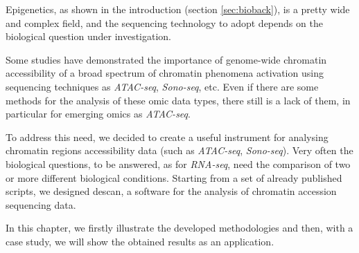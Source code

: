 
Epigenetics, as shown in the introduction (section \ref{sec:bioback}), is a pretty wide and complex field, and the sequencing technology to adopt depends on the biological question under investigation.

Some studies \cite{Koberstein2018, Auerbach2009} have demonstrated the importance of genome-wide chromatin accessibility of a broad spectrum of chromatin phenomena activation using sequencing techniques as \textit{ATAC-seq}, \textit{Sono-seq}, etc.
Even if there are some methods for the analysis of these omic data types, there still is a lack of them, in particular for emerging omics as \textit{ATAC-seq}.

To address this need, we decided to create a useful instrument for analysing chromatin regions accessibility data (such as \textit{ATAC-seq}, \textit{Sono-seq}).
Very often the biological questions, to be answered, as for \textit{RNA-seq}, need the comparison of two or more different biological conditions.
Starting from a set of already published \cite{Koberstein2018} scripts, we designed \gls{descan}, a software for the analysis of chromatin accession sequencing data.

In this chapter, we firstly illustrate the developed methodologies and then, with a case study, we will show the obtained results as an application.